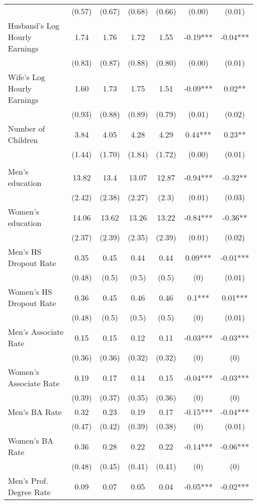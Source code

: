 \begin{landscape}
\begin{ThreePartTable}
\begin{longtable}{@{}l*{6}{c}@{}}
 & (0.57) & (0.67) & (0.68) & (0.66) & (0.00) & (0.01) \\
Husband's Log Hourly Earnings & 1.74 & 1.76 & 1.72 & 1.55 & -0.19*** & -0.04*** \\
 & (0.83) & (0.87) & (0.88) & (0.80) & (0.00) & (0.01) \\
Wife's Log Hourly Earnings & 1.60 & 1.73 & 1.75 & 1.51 & -0.09*** & 0.02** \\
 & (0.93) & (0.88) & (0.89) & (0.79) & (0.01) & (0.02) \\
Number of Children & 3.84 & 4.05 & 4.28 & 4.29 & 0.44*** & 0.23** \\
 & (1.44) & (1.70) & (1.84) & (1.72) & (0.00) & (0.01) \\
\addlinespace
\multicolumn{7}{@{}l}{\textbf{Panel B: Children's Education}}\\
Men's education & 13.82 & 13.4 & 13.07 & 12.87 & -0.94*** & -0.32** \\
 & (2.42) & (2.38) & (2.27) & (2.3) & (0.01) & (0.03) \\
Women's education & 14.06 & 13.62 & 13.26 & 13.22 & -0.84*** & -0.36** \\
 & (2.37) & (2.39) & (2.35) & (2.39) & (0.01) & (0.02) \\
Men's HS Dropout Rate & 0.35 & 0.45 & 0.44 & 0.44 & 0.09*** & -0.01*** \\
 & (0.48) & (0.5) & (0.5) & (0.5) & (0) & (0.01) \\
Women's HS Dropout Rate & 0.36 & 0.45 & 0.46 & 0.46 & 0.1*** & 0.01*** \\
 & (0.48) & (0.5) & (0.5) & (0.5) & (0) & (0.01) \\
Men's Associate Rate & 0.15 & 0.15 & 0.12 & 0.11 & -0.03*** & -0.03*** \\
 & (0.36) & (0.36) & (0.32) & (0.32) & (0) & (0) \\
Women's Associate Rate & 0.19 & 0.17 & 0.14 & 0.15 & -0.04*** & -0.03*** \\
 & (0.39) & (0.37) & (0.35) & (0.36) & (0) & (0) \\
Men's BA Rate & 0.32 & 0.23 & 0.19 & 0.17 & -0.15*** & -0.04*** \\
 & (0.47) & (0.42) & (0.39) & (0.38) & (0) & (0.01) \\
Women's BA Rate & 0.36 & 0.28 & 0.22 & 0.22 & -0.14*** & -0.06*** \\
 & (0.48) & (0.45) & (0.41) & (0.41) & (0) & (0) \\
Men's Prof. Degree Rate & 0.09 & 0.07 & 0.05 & 0.04 & -0.05*** & -0.02*** \\

\end{longtable}
\end{ThreePartTable}
\end{landscape}
